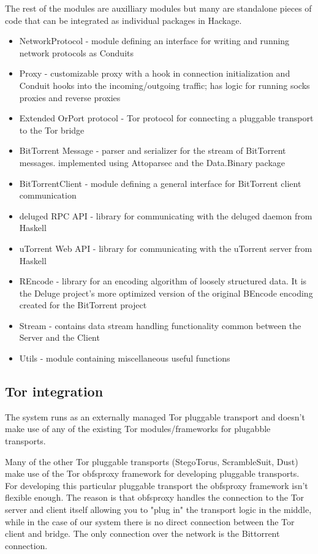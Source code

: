\documentclass[11pt]{article} %
\begin{document}
The rest of the modules are auxilliary modules but many are standalone pieces of code that can be integrated as individual packages in Hackage.

\begin{itemize}
\item NetworkProtocol - module defining an interface for writing and running network protocols as Conduits
\item Proxy - customizable proxy with a hook in connection initialization and Conduit hooks into the incoming/outgoing traffic; has logic for running socks proxies and reverse proxies
\item Extended OrPort protocol  - Tor protocol for connecting a pluggable transport to the Tor bridge
\item BitTorrent Message  - parser and serializer for the stream of BitTorrent messages. implemented using Attoparsec and the Data.Binary package
\item BitTorrentClient - module defining a general interface for BitTorrent client communication
\item deluged RPC API - library for communicating with the deluged daemon from Haskell
\item uTorrent Web API - library for communicating with the uTorrent server from Haskell
\item REncode - library for an encoding algorithm of loosely structured data. It is the Deluge project's more optimized version of the original BEncode encoding created for the BitTorrent project 
\item Stream - contains data stream handling functionality common between the Server and the Client
\item Utils - module containing miscellaneous useful functions
\end{itemize}


\subsection{Tor integration}

The system runs as an externally managed Tor pluggable transport and doesn't make use of any of the existing Tor modules/frameworks for plugabble transports.

Many of the other Tor pluggable transports (StegoTorus, ScrambleSuit, Dust) make use of the Tor obfsproxy  framework for developing pluggable transports. For developing this particular pluggable transport the obfsproxy framework isn't flexible enough. The reason is that obfsproxy handles the connection to the Tor server and client itself allowing you to "plug in" the transport logic in the middle, while in the case of our system there is no direct connection between the Tor client and bridge. The only connection over the network is the Bittorrent connection.
\end{document}

